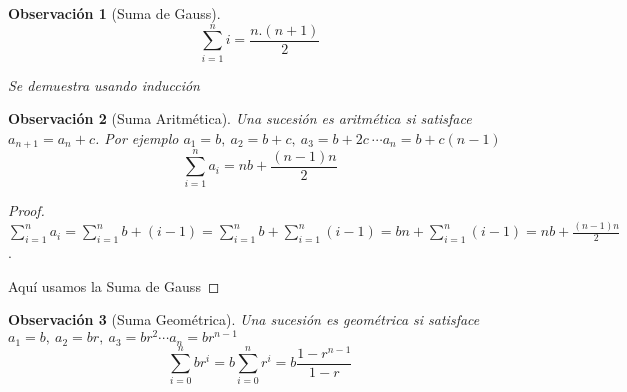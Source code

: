 \documentclass{article}
\theoremstyle{break}
\newtheorem*{remark}{Observación}
\begin{document}
    \begin{remark}[Suma de Gauss]
        $$ \sum_{i=1}^{n} i = \frac{n.(n+1)}{2}$$

        \noindent Se demuestra usando inducción
    \end{remark}
    \begin{remark}[Suma Aritmética]
        Una sucesión es aritmética si satisface $a_{n+1} = a_n + c$. Por ejemplo $a_1 = b, \ a_2 = b + c, \ a_3 = b +2c \ \cdots a_n = b +c(n-1) $
        $$ \sum_{i=1}^{n} a_i = nb + \frac{(n-1)n}{2}$$
    \end{remark}    
    \begin{proof}
        $\sum_{i=1}^{n} a_i = \sum_{i=1}^{n} b + (i-1) = \sum_{i=1}^{n} b + \sum_{i=1}^{n} (i-1) = bn + \sum_{i=1}^{n} (i-1) = nb + \frac{(n-1)n}{2}$. 
        
        Aquí usamos la Suma de Gauss
    \end{proof}

    \begin{remark}[Suma Geométrica]
        Una sucesión es geométrica si satisface $a_1 = b, \ a_2 = br , \ a_3 = br^2 \cdots a_n = br^{n-1}$
        $$ \sum_{i=0}^{n} br^i = b\sum_{i=0}^{n} r^i  = b \frac{1-r^{n-1}}{1-r}$$
    \end{remark}
\end{document}
